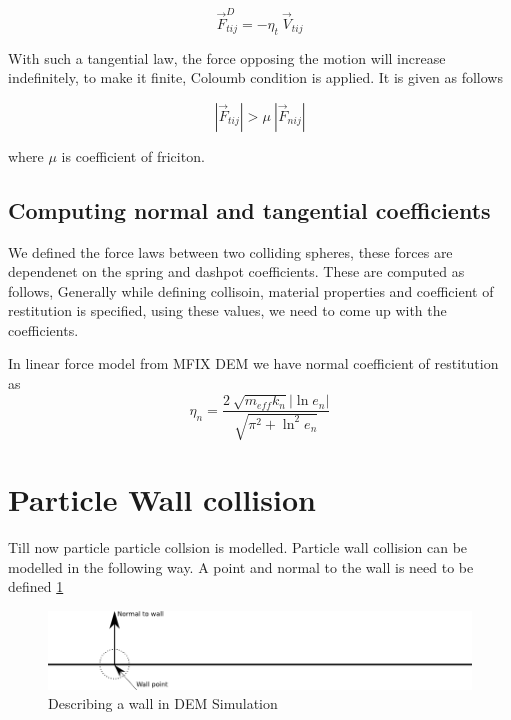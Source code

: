 \begin{equation}
  \label{eq:tang_damp_force}
  \vec{F}_{tij}^D = -\eta_t \> \vec{V}_{tij}
\end{equation}

With such a tangential law, the force opposing the motion will increase indefinitely,
to make it finite, Coloumb condition is applied. It is given as follows

\begin{equation}
  \label{eq:coloumb}
  |\vec{F}_{tij}| > \mu \> |\vec{F}_{nij}|
\end{equation}

where $\mu$ is coefficient of friciton.

\subsection{Computing normal and tangential coefficients}

We defined the force laws between two colliding spheres, these forces are
dependenet on the spring and dashpot coefficients. These are computed as follows,
Generally while defining collisoin, material properties and coefficient of restitution is
specified, using these values, we need to come up with the coefficients.

In linear force model from MFIX DEM we have normal coefficient of restitution as
\begin{equation}
  \label{eq:damping_coefficient}
  \eta_{n} = \frac{2 \> \sqrt{m_{eff}k_{n}}|\ln e_n|}{\sqrt{\pi^2 + \ln^2e_{n}}}
\end{equation}


\section{Particle Wall collision}
\label{sec:PWColl}

Till now particle particle collsion is modelled. Particle wall
collision can be modelled in the following way. A point and normal to
the wall is need to be defined \ref{fig:wall_description}

\begin{figure}
  \centering
  \includegraphics[scale=2.]{dem/wall_description}
  \caption{Describing a wall in DEM Simulation}
  \label{fig:wall_description}
\end{figure}


